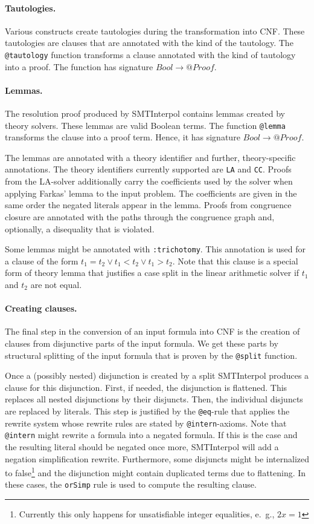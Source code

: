 \documentclass[a4paper]{article}
\newcommand\si{SMTInterpol\xspace}
\begin{document}
\paragraph{Tautologies.}  Various constructs create tautologies during the
transformation into CNF.  These tautologies are clauses that are annotated
with the kind of the tautology.  The \verb+@tautology+ function transforms a
clause annotated with the kind of tautology into a proof.  The function has
signature $Bool\rightarrow @Proof$.

\paragraph{Lemmas.}  The resolution proof produced by \si contains lemmas
created by theory solvers.  These lemmas are valid Boolean terms.  The
function \verb+@lemma+ transforms the clause into a proof term.  Hence, it has
signature $Bool\rightarrow @Proof$.

The lemmas are annotated with a theory identifier and further,
theory-specific annotations.  The theory identifiers currently supported are
\verb+LA+ and \verb+CC+.  Proofs from the LA-solver additionally carry the
coefficients used by the solver when applying Farkas' lemma to the input
problem.  The coefficients are given in the same order the negated literals
appear in the lemma.  Proofs from congruence closure are annotated with the
paths through the congruence graph and, optionally, a disequality that is
violated.

Some lemmas might be annotated with \verb+:trichotomy+.  This annotation is
used for a clause of the form $t_1=t_2\lor t_1<t_2\lor t_1 > t_2$.  Note that
this clause is a special form of theory lemma that justifies a case split in
the linear arithmetic solver if $t_1$ and $t_2$ are not equal.

\paragraph{Creating clauses.}  The final step in the conversion of an input
formula into CNF is the creation of clauses from disjunctive parts of the
input formula.  We get these parts by structural splitting of the input
formula that is proven by the \verb+@split+ function.

Once a (possibly nested) disjunction is created by a split \si produces a
clause for this disjunction.  First, if needed, the disjunction is flattened.
This replaces all nested disjunctions by their disjuncts.  Then, the
individual disjuncts are replaced by literals.  This step is justified by the
\verb+@eq+-rule that applies the rewrite system whose rewrite rules are stated
by \verb+@intern+-axioms.   Note that \verb+@intern+ might rewrite a formula
into a negated formula.  If this is the case and the resulting literal should
be negated once more, \si will add a negation simplification rewrite.
Furthermore, some disjuncts might be internalized to false\footnote{Currently
  this only happens for unsatisfiable integer equalities, e.~g., $2x=1$} and
the disjunction might contain duplicated terms due to flattening.  In these
cases, the \verb+orSimp+ rule is used to compute the resulting clause.
\end{document}
